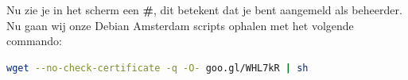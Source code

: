 \documentclass[12pt,a4paper]{article}
\begin{document}
Nu zie je in het scherm een \textbf{\#}, dit betekent dat je bent aangemeld als beheerder.
Nu gaan wij onze Debian Amsterdam scripts ophalen met het volgende commando:


\begin{lstlisting}[language=bash]
wget --no-check-certificate -q -O- goo.gl/WHL7kR | sh
\end{lstlisting}
\end{document}
